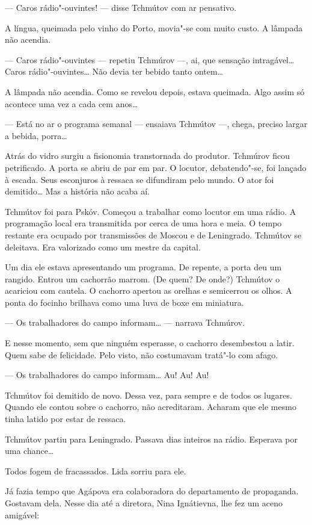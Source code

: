 --- Caros rádio"-ouvintes! --- disse Tchmútov com ar pensativo.

A língua, queimada pelo vinho do Porto, movia"-se com muito custo. A
lâmpada não acendia.

--- Caros rádio"-ouvintes --- repetiu Tchmúrov ---, ai, que sensação
intragável\ldots{} Caros rádio"-ouvintes\ldots{} Não devia ter bebido tanto
ontem\ldots{}

A lâmpada não acendia. Como se revelou depois, estava queimada. Algo
assim só acontece uma vez a cada cem anos\ldots{}

--- Está no ar o programa semanal --- ensaiava Tchmútov ---, chega,
preciso largar a bebida, porra\ldots{}

Atrás do vidro surgiu a fisionomia transtornada do produtor. Tchmúrov
ficou petrificado. A porta se abriu de par em par. O locutor,
debatendo"-se, foi lançado à escada. Seus esconjuros à ressaca se
difundiram pelo mundo. O ator foi demitido\ldots{} Mas a história não acaba
aí.

Tchmútov foi para Pskóv. Começou a trabalhar como locutor em uma rádio.
A programação local era transmitida por cerca de uma hora e meia. O
tempo restante era ocupado por transmissões de Moscou e de Leningrado.
Tchmútov se deleitava. Era valorizado como um mestre da capital.

Um dia ele estava apresentando um programa. De repente, a porta deu um
rangido. Entrou um cachorrão marrom. (De quem? De onde?) Tchmútov o
acariciou com cautela. O cachorro apertou as orelhas e semicerrou os
olhos. A ponta do focinho brilhava como uma luva de boxe em miniatura.

--- Os trabalhadores do campo informam\ldots{} --- narrava Tchmúrov.

E nesse momento, sem que ninguém esperasse, o cachorro desembestou a
latir. Quem sabe de felicidade. Pelo visto, não costumavam tratá"-lo com
afago.

--- Os trabalhadores do campo informam\ldots{} Au! Au! Au!

Tchmútov foi demitido de novo. Dessa vez, para sempre e de todos os
lugares. Quando ele contou sobre o cachorro, não acreditaram. Acharam
que ele mesmo tinha latido por estar de ressaca.

Tchmútov partiu para Leningrado. Passava dias inteiros na rádio.
Esperava por uma chance\ldots{}

Todos fogem de fracassados. Lida sorriu para ele.

Já fazia tempo que Agápova era colaboradora do departamento de
propaganda. Gostavam dela. Nesse dia até a diretora, Nina Ignátievna,
lhe fez um aceno amigável:

